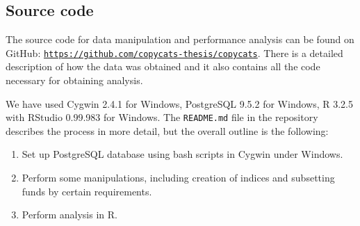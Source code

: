 \documentclass[12pt, a4]{article}
\begin{document}
\subsection*{Source code}\label{sec:source-code}
The source code for data manipulation and performance analysis can be found on GitHub: \href{https://github.com/copycats-thesis/copycats}{\texttt{https://github.com/copycats-thesis/copycats}}. There is a detailed description of how the data was obtained and it also contains all the code necessary for obtaining analysis. 

We have used Cygwin 2.4.1 for Windows, Postgre\textsc{SQL} 9.5.2 for Windows, R 3.2.5 with RStudio 0.99.983 for Windows. The \texttt{README.md} file in the repository describes the process in more detail, but the overall outline is the following:

\begin{enumerate}
    \item Set up Postgre\textsc{SQL} database using bash scripts in Cygwin under Windows.
    \item Perform some manipulations, including creation of indices and subsetting funds by certain requirements.
    \item Perform analysis in R.
\end{enumerate}
\end{document}
